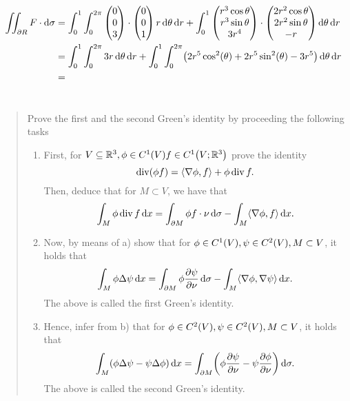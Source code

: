 \documentclass[english]{exercise}
\begin{document}
	\begin{align*}
		\iint_{\partial R}F \cdot \d\sigma &= \int_0^1 \int_0^{2\pi}\begin{pmatrix}
			0\\
			0\\
			3
		\end{pmatrix} \cdot \begin{pmatrix}
			0\\
			0\\
			1
		\end{pmatrix}r\d\theta\d r + \int_0^1 \begin{pmatrix}
			r^3 \cos\theta\\
			r^3 \sin\theta\\
			3r^4
		\end{pmatrix} \cdot \begin{pmatrix}
			2r^2 \cos\theta\\
			2r^2 \sin\theta\\
			-r
		\end{pmatrix}\d\theta\d r\\
		&= \int_0^1 \int_0^{2\pi}3r\d\theta\d r + \int_0^1 \int_0^{2\pi}\parentheses*{2r^5 \cos^2\parentheses*{\theta} + 2r^5 \sin^2\parentheses*{\theta} - 3r^5}\d\theta\d r\\
		&= 
 	\end{align*}



	\section{}

	\begin{quote}
		Prove the first and the second Green's identity by proceeding the following tasks
		\begin{enumerate}
			\item First, for \(V \subseteq \R^3, \phi \in C^1\parentheses*{V} f \in C^1\parentheses*{V; \R^3}\) prove the identity
			\[
				\div\parentheses*{\phi f} = \angles*{\nabla\phi, f} + \phi\div f.
			\]
			Then, deduce that for \(M \subset V\), we have that
			\[
				\int_M \phi\div f\d x = \int_{\partial M}\phi f \cdot \nu\d\sigma - \int_M \angles*{\nabla\phi, f}\d x.
			\]
			\item Now, by means of a) show that for \(\phi \in C^1\parentheses*{V}, \psi \in C^2\parentheses*{V}, M \subset V\), it holds that
			\[
				\int_M \phi\Delta\psi\d x = \int_{\partial M}\phi\frac{\partial\psi}{\partial\nu}\d\sigma - \int_M \angles*{\nabla\phi, \nabla\psi}\d x.
			\]
			The above is called the first Green's identity.
			\item Hence, infer from b) that for \(\phi \in C^2\parentheses*{V}, \psi \in C^2\parentheses*{V}, M \subset V\), it holds that
			\[
				\int_M \parentheses*{\phi\Delta\psi - \psi\Delta\phi}\d x = \int_{\partial M}\parentheses*{\phi\frac{\partial\psi}{\partial\nu} - \psi\frac{\partial\phi}{\partial\nu}}\d\sigma.
			\]
			The above is called the second Green's identity.
		\end{enumerate}
	\end{quote}
\end{document}
